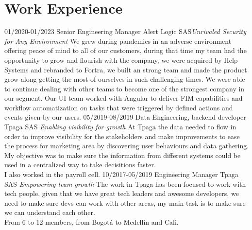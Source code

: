 \section{Work Experience}

\begin{entrylist}
  \entry
    {01/2020-01/2023}
    {Senior Engineering Manager}
    {Alert Logic SAS{\sl Unrivaled Security for Any Environment}}
    {We grew during pandemics in an adverse environment offering
    peace of mind to all of our customers, during that time my team
    had the opportunity to grow and flourish with the company, we
    were acquired by Help Systems and rebranded to Fortra, we built
    an strong team and made the product grow along getting the
    most of ourselves in such challenging times.  We were able
    to continue dealing with other teams to become one of the
    strongest company in our segment. Our UI team worked with Angular
    to deliver FIM capabilities and workflow automatization on tasks
    that were triggered by defined actions and events given by our users.}
  \entry
    {05/2019-08/2019}
    {Data Engineering, backend developer}
    {Tpaga SAS {\sl Enabling visibility for growth}}
    {At Tpaga the data needed to flow in order to improve visibility for the
    stakeholders and make improvements to ease the process for marketing area
    by discovering user behaviours and data gathering.  My objective was to
    make sure the information from different systems could be used in a centralized
    way to take decisitions faster.\\I also worked in the payroll cell.}
  \entry
    {10/2017-05/2019}
    {Engineering Manager}
    {Tpaga SAS {\sl Empowering team growth}}
    {The work in Tpaga has been focused to work with tech people, given
    that we have great tech leaders and awesome developers, we need to
    make sure devs can work with other areas, my main task is to make
    sure we can understand each other.\\From 6 to 12 members, from Bogotá to Medellín and Cali. }

  \end{entrylist}
  
  \newpage
  

